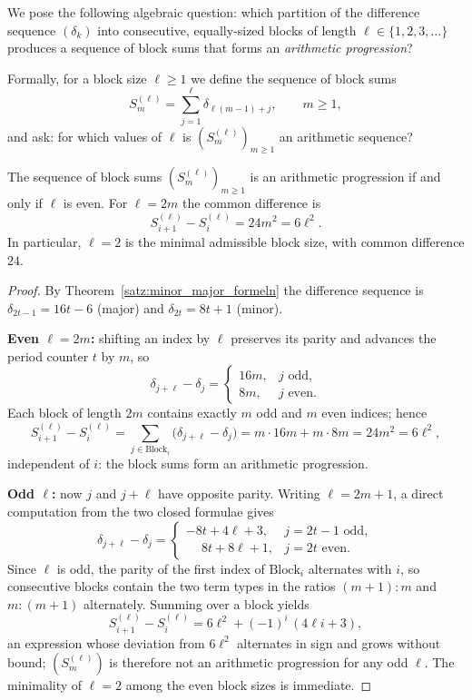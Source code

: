 We pose the following algebraic question: which partition of the
difference sequence $(\delta_k)$ into consecutive, equally-sized blocks
of length $\ell \in \{1, 2, 3, \ldots\}$ produces a sequence of block
sums that forms an \emph{arithmetic progression}?

Formally, for a block size $\ell \geq 1$ we define the sequence of
block sums
\[
  S_m^{(\ell)} = \sum_{j=1}^{\ell} \delta_{\ell(m-1)+j},\qquad m \geq 1,
\]
and ask: for which values of $\ell$ is $(S_m^{(\ell)})_{m \geq 1}$
an arithmetic sequence?

\begin{theorem}\label{satz:eindeutigkeit}
The sequence of block sums $(S_m^{(\ell)})_{m \geq 1}$ is an arithmetic
progression if and only if $\ell$ is even. For $\ell = 2m$ the common
difference is
\[
  S_{i+1}^{(\ell)} - S_i^{(\ell)} = 24m^2 = 6\ell^2 .
\]
In particular, $\ell = 2$ is the minimal admissible block size, with
common difference $24$.
\end{theorem}

\begin{proof}
By Theorem~\ref{satz:minor_major_formeln} the difference sequence is
$\delta_{2t-1} = 16t - 6$ (major) and $\delta_{2t} = 8t + 1$ (minor).

\textbf{Even $\ell = 2m$:} shifting an index by $\ell$ preserves its
parity and advances the period counter $t$ by $m$, so
\[
  \delta_{j+\ell} - \delta_j =
  \begin{cases}
    16m, & j \text{ odd},\\
    8m,  & j \text{ even}.
  \end{cases}
\]
Each block of length $2m$ contains exactly $m$ odd and $m$ even indices;
hence
\[
  S_{i+1}^{(\ell)} - S_i^{(\ell)}
  = \sum_{j \in \text{Block}_i} \bigl(\delta_{j+\ell} - \delta_j\bigr)
  = m \cdot 16m + m \cdot 8m = 24m^2 = 6\ell^2,
\]
independent of $i$: the block sums form an arithmetic progression.

\textbf{Odd $\ell$:} now $j$ and $j+\ell$ have opposite parity. Writing
$\ell = 2m+1$, a direct computation from the two closed formulae gives
\[
  \delta_{j+\ell} - \delta_j =
  \begin{cases}
    -8t + 4\ell + 3, & j = 2t-1 \text{ odd},\\
    \phantom{-}8t + 8\ell + 1, & j = 2t \text{ even}.
  \end{cases}
\]
Since $\ell$ is odd, the parity of the first index of $\text{Block}_i$
alternates with $i$, so consecutive blocks contain the two term types in
the ratios $(m{+}1) : m$ and $m : (m{+}1)$ alternately. Summing over a
block yields
\[
  S_{i+1}^{(\ell)} - S_i^{(\ell)} = 6\ell^2 + (-1)^i\,(4\ell i + 3),
\]
an expression whose deviation from $6\ell^2$ alternates in sign and grows
without bound; $(S_m^{(\ell)})$ is therefore not an arithmetic
progression for any odd $\ell$. The minimality of $\ell = 2$ among the
even block sizes is immediate.
\end{proof}

